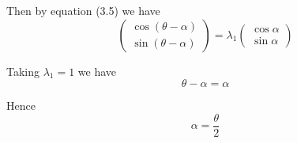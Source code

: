 Then by equation (3.5) we have
\begin{equation*}
\begin{pmatrix}
\cos(\theta-\alpha)
\\
\sin(\theta-\alpha)
\end{pmatrix}
=\lambda_1\begin{pmatrix}\cos\alpha\\\sin\alpha\end{pmatrix}
\end{equation*}

Taking $\lambda_1=1$ we have
\begin{equation*}
\theta-\alpha=\alpha
\end{equation*}

Hence
\begin{equation*}
\alpha=\frac{\theta}{2}
\end{equation*}


